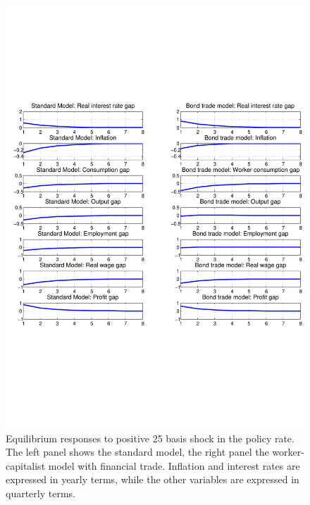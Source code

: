 \begin{figure}[ht] 
\centering 
\includegraphics[trim=0.3cm 7cm 0cm 6cm, clip, width=\textwidth]{./figures/monetary_std_bt.pdf} 
\caption{Equilibrium responses to positive 25 basis shock in the policy rate. The left panel shows the standard model, the right panel the worker-capitalist model with financial trade. Inflation and interest rates are expressed in yearly terms, while the other variables are expressed in quarterly terms.} 
\label{fig_monetary_std_bt} 
\end{figure}